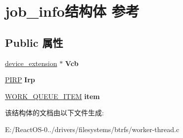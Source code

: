 \hypertarget{structjob__info}{}\section{job\+\_\+info结构体 参考}
\label{structjob__info}
\subsection*{Public 属性}
\begin{DoxyCompactItemize}
\item 
\mbox{\label{structjob__info_a4fa4fbcf6dafed1ae0164366097d1891}} 
\hyperlink{struct__device__extension}{device\+\_\+extension} $\ast$ {\bfseries Vcb}
\item 
\mbox{\label{structjob__info_a4290b6013c279d7f17b01d7973392769}} 
\hyperlink{interfacevoid}{P\+I\+RP} {\bfseries Irp}
\item 
\mbox{\label{structjob__info_aeac32158b63544ca1f973c8e660c883c}} 
\hyperlink{struct___w_o_r_k___q_u_e_u_e___i_t_e_m}{W\+O\+R\+K\+\_\+\+Q\+U\+E\+U\+E\+\_\+\+I\+T\+EM} {\bfseries item}
\end{DoxyCompactItemize}


该结构体的文档由以下文件生成\+:\begin{DoxyCompactItemize}
\item 
E\+:/\+React\+O\+S-\/0../drivers/filesystems/btrfs/worker-\/thread.\+c\end{DoxyCompactItemize}
